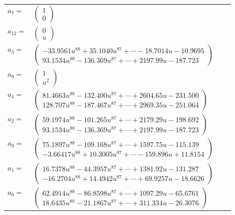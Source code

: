 \documentclass[1p]{elsarticle_modified}
\theoremstyle{definition}
\begin{document}
\begin{tabular}{m{7pt} m{180pt} m{7pt} m{180pt} }
\flushright $a_{7}=$&$\begin{pmatrix}1\\0\end{pmatrix}$ \\
\flushright $a_{12}=$&$\begin{pmatrix}0\\u\end{pmatrix}$ \\
\flushright $a_{3}=$&$\begin{pmatrix}-33.9561 u^{88}+35.1040 u^{87}+\cdots-18.7014 u-10.9695\\93.1534 u^{88}-136.369 u^{87}+\cdots+2197.99 u-187.723\end{pmatrix}$ \\
\flushright $a_{8}=$&$\begin{pmatrix}1\\u^2\end{pmatrix}$ \\
\flushright $a_{4}=$&$\begin{pmatrix}81.4663 u^{88}-132.400 u^{87}+\cdots+2604.65 u-231.500\\128.707 u^{88}-187.467 u^{87}+\cdots+2969.35 u-251.064\end{pmatrix}$ \\
\flushright $a_{2}=$&$\begin{pmatrix}59.1974 u^{88}-101.265 u^{87}+\cdots+2179.29 u-198.692\\93.1534 u^{88}-136.369 u^{87}+\cdots+2197.99 u-187.723\end{pmatrix}$ \\
\flushright $a_{9}=$&$\begin{pmatrix}75.1897 u^{88}-109.168 u^{87}+\cdots+1597.75 u-115.139\\-3.66417 u^{88}+10.3005 u^{87}+\cdots-159.896 u+11.8154\end{pmatrix}$ \\
\flushright $a_{1}=$&$\begin{pmatrix}16.7378 u^{88}-44.3957 u^{87}+\cdots+1381.92 u-131.287\\-16.2704 u^{88}+14.4942 u^{87}+\cdots+69.9257 u-18.6626\end{pmatrix}$ \\
\flushright $a_{6}=$&$\begin{pmatrix}62.4914 u^{88}-86.8598 u^{87}+\cdots+1097.29 u-65.6761\\18.6435 u^{88}-21.1867 u^{87}+\cdots+311.334 u-26.3076\end{pmatrix}$ \\

\end{tabular}
\end{document}
